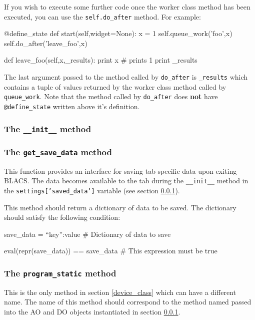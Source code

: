 \documentclass[12pt]{article}
\begin{document}
If you wish to execute some further code once the worker class method has been executed, you can use the \texttt{self.do\_after} method. For example:
\begin{python}
    @define_state
    def start(self,widget=None):
        x = 1
        self.queue_work('foo',x)
        self.do_after('leave_foo',x)
        
    def leave_foo(self,x,_results):
        print x # prints 1
        print _results
\end{python}
The last argument passed to the method called by \texttt{do\_after} is \texttt{\_results} which contains a tuple of values returned by the worker class method called by \texttt{queue\_work}. Note that the method called by \texttt{do\_after} does \textbf{not} have \texttt{@define\_state} written above it's definition.

\subsubsection{The \texttt{\_\_init\_\_} method}\label{device_class_init}

\subsubsection{The \texttt{get\_save\_data} method} \label{device_class_get_save_data}
This function provides an interface for saving tab specific data upon exiting BLACS. The data becomes available to the tab during the \texttt{\_\_init\_\_} method in the \texttt{settings['saved\_data']} variable (see section \ref{device_class_init}).

This method should return a dictionary of data to be saved. The dictionary should satisfy the following condition:
\begin{python}
save_data = {``key'':value} # Dictionary of data to save

eval(repr(save_data)) == save_data # This expression must be true
\end{python}


\subsubsection{The \texttt{program\_static} method} \label{device_class_program_static}
This is the only method in section \ref{device_class} which can have a different name. The name of this method should correspond to the method named passed into the AO and DO objects instantiated in section \ref{device_class_init}.
\end{document}
